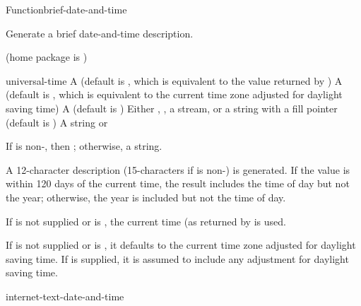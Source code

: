 \documentclass[10pt,twoside,english,pdftex]{article}
\begin{document}

\begin{functiondoc}{Function}{brief-date-and-time}{%
     
    \returns{} }
% 
% 

\fnsyntax

\fnpurpose Generate a brief date-and-time description.

\fnpackage {} (home package is )

\fnmodule {}

\fnargs
\begin{args}{universal-time}
 A  (default is \nil,
  which is equivalent to the value returned by
  )
 A  (default is \nil,
  which is equivalent to the current time zone adjusted for daylight
  saving time)
 A  (default is \nil)
\arg[destination] Either \nil, , a stream, or a string with a fill 
pointer (default is \nil)
\arg[result] A string or \nil{}
\end{args}

\fnreturns If  is non-\nil, then \nil; otherwise, a string.

\fndescription A 12-character description (15-characters if
 is non-\nil{}) is generated.  If the
 value is within 120 days of the current time,
the result  includes the time of day but not the year;
otherwise, the year is included but not the time of day.

\W{} 
%
%
If  is not supplied or is \nil, the current time
(as returned by  is used.

\W{} 
%
If  is not supplied or is \nil, it defaults to the
current time zone adjusted for daylight saving time. If
 is supplied, it is assumed to include any adjustment
for daylight saving time.

\begin{alsos}{internet-text-date-and-time}
\end{alsos}


\end{functiondoc}
\end{document}
